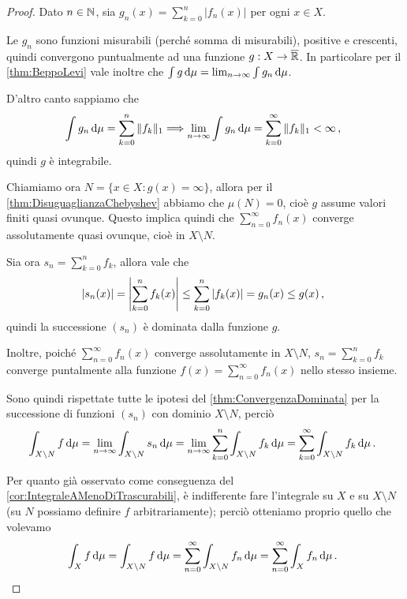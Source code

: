\begin{proof}
	Dato $n\in \mathbb N$, sia $g_n(x)=\sum_{k=0}^n|f_n(x)|$ per ogni $x\in X$. 
	
	Le $g_n$ sono funzioni misurabili (perché somma di misurabili), positive e crescenti, quindi convergono puntualmente ad una funzione $g:X\to\overline{\mathbb R}$. In particolare per il \cref{thm:BeppoLevi} vale inoltre che $\int g\,\mathrm d\mu=\lim_{n\to\infty}\int g_n\,\mathrm d\mu$.
	
	D'altro canto sappiamo che 
	\begin{equation*}
		\int g_n\,\mathrm d\mu=\sum_{k=0}^n\Vert  f_k\Vert_1 \Longrightarrow \lim_{n\to\infty}\int g_n\,\mathrm d\mu=\sum_{k=0}^\infty \Vert  f_k\Vert_1<\infty\, \text{, }
	\end{equation*}
	quindi $g$ è integrabile.
	
	Chiamiamo ora $N=\{ x\in X:g(x)=\infty\}$, allora per il \cref{thm:DisuguaglianzaChebyshev} abbiamo che $\mu(N)=0$, cioè $g$ assume valori finiti quasi ovunque. Questo implica quindi che $\sum_{n=0}^\infty f_n(x)$ converge assolutamente quasi ovunque, cioè in $X\setminus N$.
	
	Sia ora $s_n=\sum_{k=0}^n f_k$, allora vale che
	\begin{equation*}
		|s_n(x)|=\left|\sum_{k=0}^n f_k(x)\right|\le \sum_{k=0}^n |f_k(x)|=g_n(x)\le g(x)\, \text{, }
	\end{equation*}
	quindi la successione $(s_n)$ è dominata dalla funzione $g$.
	
	Inoltre, poiché $\sum_{n=0}^\infty f_n(x)$ converge assolutamente in $X\setminus N$, $s_n=\sum_{k=0}^n f_k$ converge puntalmente alla funzione $f(x)=\sum_{n=0}^\infty f_n(x)$ nello stesso insieme.
	
	Sono quindi rispettate tutte le ipotesi del \cref{thm:ConvergenzaDominata} per la successione di funzioni $(s_n)$ con dominio $X\setminus N$, perciò
	\begin{equation*}
		\int_{X\setminus N} f\,\mathrm d\mu=\lim_{n\to\infty}\int_{X\setminus N}s_n\,\mathrm d\mu=\lim_{n\to\infty}\sum_{k=0}^n\int_{X\setminus N}  f_k\,\mathrm d\mu= \sum_{k=0}^\infty\int_{X\setminus N}f_k\,\mathrm d\mu\, \text{. }
	\end{equation*}

	Per quanto già osservato come conseguenza del \cref{cor:IntegraleAMenoDiTrascurabili}, è indifferente fare l'integrale su $X$ e su $X\setminus N$ (su $N$ possiamo definire $f$ arbitrariamente); perciò otteniamo proprio quello che volevamo
	\begin{equation*}
		\int_X f\,\mathrm d\mu=\int_{X\setminus N} f\,\mathrm d\mu=\sum_{n=0}^\infty\int_{X\setminus N}f_n\,\mathrm d\mu=\sum_{n=0}^\infty\int_X f_n\,\mathrm d\mu\, \text{. }
	\end{equation*}
\end{proof}

